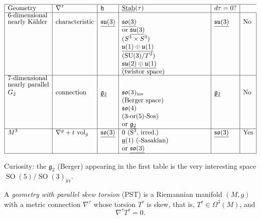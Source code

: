 \[
\begin{array}{|l|l|l|l|l|l|}
\hline
\text{Geometry}
&
\nabla^\tau
&
\mathfrak h
&
\underline{\operatorname{Stab}}(\tau)
&
d\tau=0?
\\
\hline
\shortstack[l]{6-dimensional\\
nearly K\"ahler}
&
\text{characteristic}
&
\underline{\mathfrak{su}(3)}
&
\parbox[t]{13em}{\raggedright
$\underline{\mathfrak{so}(3)}$\\
or $\underline{\mathfrak{su}(3)}$\\
$(S^3\times S^3)$\\
$\underline{\mathfrak{u}(1)\oplus
\mathfrak{u}(1)}$\\
$(\operatorname{SU}(3)/T^2)$\\
$\underline{\mathfrak{su}(2)\oplus
\mathfrak{u}(1)}$\\
(twistor space)}
&
\underline{\mathfrak{su}(3)}
&
\text{No}
\\
\hline
\shortstack[l]{7-dimensional\\
nearly parallel\\
$G_2$}
&
\text{connection}
&
\underline{\mathfrak g_2}
&
\parbox[t]{13em}{\raggedright
$\mathfrak{so}(3)_{\mathrm{inv}}$\\
(Berger space)\\
$\mathfrak{so}(4)$\\
(3-or(5)-Sos)\\
or $\underline{\mathfrak g_2}$}
&
\underline{\mathfrak g_2}
&
\text{No}
\\
\hline
M^3
&
\nabla^g+t\,\operatorname{vol}_g
&
\underline{\mathfrak{so}(3)}
&
\parbox[t]{12em}{\raggedright
0\ (S$^3$, irred.)\\
$\underline{\mathfrak u}(1)$\ 
(-Sasakian)\\
or $\underline{\mathfrak{so}(3)}$}
&
\underline{\mathfrak{so}(3)}
&
\text{Yes}
\\
\hline
\end{array}
\]


\noindent
Curiosity: the 
$\mathfrak g_2$ (Berger) appearing
in the first table
is the very interesting
space
$\operatorname{SO}(5)/
\operatorname{SO}(3)_{\mathrm{irr}}$.

\medskip

\begin{definition}
\label{definition-geometry-parallel}
A {\it geometry with parallel skew
torsion} (PST) is a Riemannian
manifold
$(M,g)$ with a metric connection
$\nabla^\tau$
whose torsion $T^\tau$ is skew,
that is,
$T^\tau\in\Omega^3(M)$,
and
\[
\nabla^\tau T^\tau=0.
\]
\end{definition}

